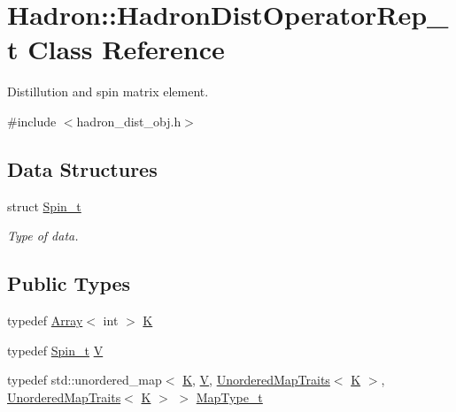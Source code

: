 \hypertarget{classHadron_1_1HadronDistOperatorRep__t}{}\section{Hadron\+:\+:Hadron\+Dist\+Operator\+Rep\+\_\+t Class Reference}
\label{classHadron_1_1HadronDistOperatorRep__t}


Distillution and spin matrix element.  




{\ttfamily \#include $<$hadron\+\_\+dist\+\_\+obj.\+h$>$}

\subsection*{Data Structures}
\begin{DoxyCompactItemize}
\item 
struct \mbox{\hyperlink{structHadron_1_1HadronDistOperatorRep__t_1_1Spin__t}{Spin\+\_\+t}}
\begin{DoxyCompactList}\small\item\em Type of data. \end{DoxyCompactList}\end{DoxyCompactItemize}
\subsection*{Public Types}
\begin{DoxyCompactItemize}
\item 
typedef \mbox{\hyperlink{classXMLArray_1_1Array}{Array}}$<$ int $>$ \mbox{\hyperlink{classHadron_1_1HadronDistOperatorRep__t_a670c7409bfd80616aeb0159590bcdb6b}{K}}
\item 
typedef \mbox{\hyperlink{structHadron_1_1HadronDistOperatorRep__t_1_1Spin__t}{Spin\+\_\+t}} \mbox{\hyperlink{classHadron_1_1HadronDistOperatorRep__t_a40f37383ae57b1d0bbf944d698a10382}{V}}
\item 
typedef std\+::unordered\+\_\+map$<$ \mbox{\hyperlink{classHadron_1_1HadronDistOperatorRep__t_a670c7409bfd80616aeb0159590bcdb6b}{K}}, \mbox{\hyperlink{classHadron_1_1HadronDistOperatorRep__t_a40f37383ae57b1d0bbf944d698a10382}{V}}, \mbox{\hyperlink{structADAT_1_1UnorderedMapTraits}{Unordered\+Map\+Traits}}$<$ \mbox{\hyperlink{classHadron_1_1HadronDistOperatorRep__t_a670c7409bfd80616aeb0159590bcdb6b}{K}} $>$, \mbox{\hyperlink{structADAT_1_1UnorderedMapTraits}{Unordered\+Map\+Traits}}$<$ \mbox{\hyperlink{classHadron_1_1HadronDistOperatorRep__t_a670c7409bfd80616aeb0159590bcdb6b}{K}} $>$ $>$ \mbox{\hyperlink{classHadron_1_1HadronDistOperatorRep__t_a28874b1705be0d32099d426de9fb44c0}{Map\+Type\+\_\+t}}
\end{DoxyCompactItemize}
